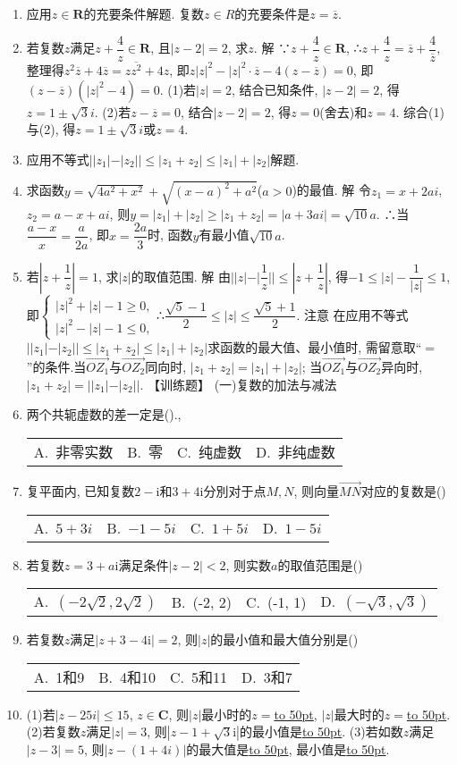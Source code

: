 \documentclass[10pt,a4paper]{article}
\newcommand{\blank}[1]{\underline{\hbox to #1pt{}}}
\newcommand{\fourch}[4]{\par\begin{tabular}{p{.23\textwidth}p{.23\textwidth}p{.23\textwidth}p{.23\textwidth}}
A.~#1 &B.~#2& C.~#3& D.~#4
\end{tabular}}
\begin{document}
\begin{enumerate}[1.]
\item 应用$z\in \mathbf{R}$的充要条件解题.
复数$z\in R$的充要条件是$z=\overline z$.
\item 若复数$z$满足$z+\dfrac 4z\in \mathbf{R}$, 且$|z-2|=2$, 求$z$.
解  ∵$z+\dfrac 4z\in \mathbf{R}$, ∴$z+\dfrac 4z=\overline z+\dfrac 4{\overline z}$, 整理得$z^2\overline z+4\overline z=z\overline{z^2}+4z$,
即$z|z|^2-|z|^2\cdot \overline z-4(z-\overline z)=0$, 即$(z-\overline z)(|z|^2-4)=0$.
(1)若$|z|=2$, 结合已知条件, $|z-2|=2$, 得$z=1\pm \sqrt 3i$.
(2)若$z-\overline z=0$, 结合$|z-2|=2$, 得$z=0$(舍去)和$z=4$.
综合(1)与(2), 得$z=1\pm \sqrt 3i$或$z=4$.
\item 应用不等式$||z_1|-|z_2||\le|z_1+z_2|\le|z_1|+|z_2|$解题.
\item 求函数$y=\sqrt {4a^2+x^2}+\sqrt {(x-a)^2+a^2}$($a>0$)的最值.
解  令$z_1=x+2ai$, $z_2=a-x+ai$,
则$y=|z_1|+|z_2|\ge|z_1+z_2|=|a+3ai|=\sqrt {10}a$.
∴当$\dfrac{a-x}x=\dfrac a{2a}$, 即$x=\dfrac{2a}3$时, 函数$y$有最小值$\sqrt {10}a$.
\item 若$|z+\dfrac 1z|=1$, 求$|z|$的取值范围.
解  由$||z|-|\dfrac 1z||\le|z+\dfrac 1z|$, 得$-1\le|z|-\dfrac 1{|z|}\le 1$,
即$\begin{cases}|z|^2+|z|-1\ge 0, \\|z|^2-|z|-1\le 0, \end{cases}$∴$\dfrac{\sqrt 5-1}2\le|z|\le \dfrac{\sqrt 5+1}2$.
注意  在应用不等式$||z_1|-|z_2||\le|z_1+z_2|\le|z_1|+|z_2|$求函数的最大值、最小值时, 需留意取``$=$''的条件.当$\overrightarrow{OZ_1}$与$\overrightarrow{OZ_2}$同向时, $|z_1+z_2|=|z_1|+|z_2|$; 当$\overrightarrow{OZ_1}$与$\overrightarrow{OZ_2}$异向时, $|z_1+z_2|=||z_1|-|z_2||$.
【训练题】
(一)复数的加法与减法
\item 两个共轭虚数的差一定是().,
\fourch{非零实数}{零}{纯虚数}{非纯虚数}
\item 复平面内, 已知复数$2-\mathrm{i}$和$3+4\mathrm{i}$分別对于点$M,N$, 则向量$\overrightarrow{MN}$对应的复数是()
\fourch{$5+3i$}{$-1-5i$}{$1+5i$}{$1-5i$}
\item 若复数$z=3+a\mathrm{i}$满足条件$|z-2|<2$, 则实数$a$的取值范围是()
\fourch{$(-2\sqrt 2,2\sqrt 2)$}{(-2, 2)}{(-1, 1)}{$(-\sqrt 3,\sqrt 3)$}
\item 若复数$z$满足$|z+3-4\mathrm{i}|=2$, 则$|z|$的最小值和最大值分别是()
\fourch{1和9}{4和10}{5和11}{3和7}
\item (1)若$|z-25i|\le 15$, $z\in \mathbf{C}$, 则$|z|$最小时的$z=$\blank{50}, $|z|$最大时的$z=$\blank{50}.
(2)若复数$z$满足$|z|=3$, 则$|z-1+\sqrt 3\mathrm{i}|$的最小值是\blank{50}.
(3)若如数$z$满足$|z-3|=5$, 则$|z-(1+4i)|$的最大值是\blank{50}, 最小值是\blank{50}.

\end{enumerate}
\end{document}
